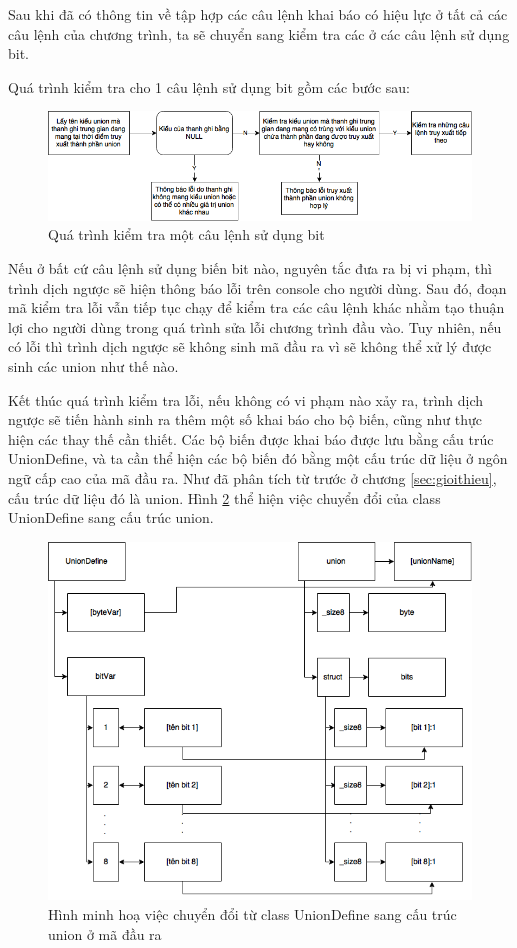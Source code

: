 \label{sec:laststep}
Sau khi đã có thông tin về tập hợp các câu lệnh khai báo có hiệu lực ở tất cả các câu lệnh của chương trình, ta sẽ chuyển sang kiểm tra các ở các câu lệnh sử dụng bit.

Quá trình kiểm tra cho 1 câu lệnh sử dụng bit gồm các bước sau:

\begin{figure}
	\centering
	\includegraphics[width=0.7\linewidth]{image/checkUnionSteps}
	\caption{Quá trình kiểm tra một câu lệnh sử dụng bit}
	\label{fig:checkunionsteps}
\end{figure}

Nếu ở bất cứ câu lệnh sử dụng biến bit nào, nguyên tắc đưa ra bị vi phạm, thì trình dịch ngược sẽ hiện thông báo lỗi trên console cho người dùng. Sau đó, đoạn mã kiểm tra lỗi vẫn tiếp tục chạy để kiểm tra các câu lệnh khác nhằm tạo thuận lợi cho người dùng trong quá trình sửa lỗi chương trình đầu vào. Tuy nhiên, nếu có lỗi thì trình dịch ngược sẽ không sinh mã đầu ra vì sẽ không thể xử lý được sinh các union như thế nào.


Kết thúc quá trình kiểm tra lỗi, nếu không có vi phạm nào xảy ra, trình dịch ngược sẽ tiến hành sinh ra thêm một số khai báo cho bộ biến, cũng như thực hiện các thay thế cần thiết. Các bộ biến được khai báo được lưu bằng cấu trúc UnionDefine, và ta cần thể hiện các bộ biến đó bằng một cấu trúc dữ liệu ở ngôn ngữ cấp cao của mã đầu ra. Như đã phân tích từ trước ở chương \ref{sec:gioithieu}, cấu trúc dữ liệu đó là union. Hình \ref{fig:uniondefinemapping} thể hiện việc chuyển đổi của class UnionDefine sang cấu trúc union.

\begin{figure}
	\centering
	\includegraphics[width=0.7\linewidth]{image/unionDefineMapping}
	\caption{Hình minh hoạ việc chuyển đổi từ class UnionDefine sang cấu trúc union ở mã đầu ra}
	\label{fig:uniondefinemapping}
\end{figure}

